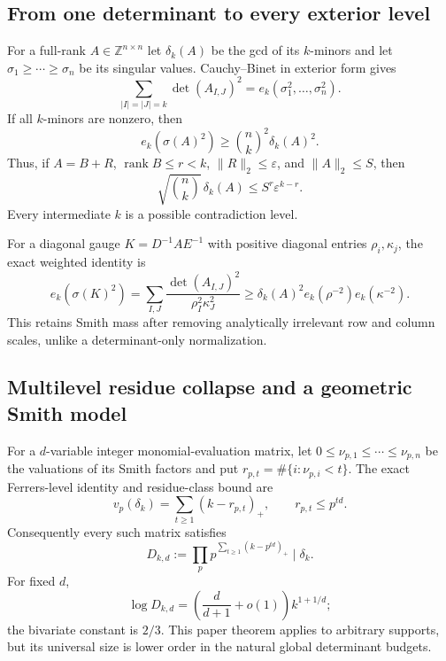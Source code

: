 \documentclass[11pt,oneside]{article}
\theoremstyle{definition}
\theoremstyle{remark}
\newcommand{\Z}{\mathbb Z}
\begin{document}
\subsection{From one determinant to every exterior level}
\label{wsmith:smith-profile}

For a full-rank $A\in\Z^{n\times n}$ let $\delta_k(A)$ be the gcd of its $k$-minors and let
$\sigma_1\ge\cdots\ge\sigma_n$ be its singular values.  Cauchy--Binet in exterior form gives
\begin{equation}
 \sum_{|I|=|J|=k}\det(A_{I,J})^2
 =e_k(\sigma_1^2,\ldots,\sigma_n^2).
 \label{wsmith:eq-exterior-minors}
\end{equation}
If all $k$-minors are nonzero, then
\begin{equation}
 e_k(\sigma(A)^2)\ge\binom nk^2\delta_k(A)^2.
 \label{wsmith:eq-smith-mass}
\end{equation}
Thus, if $A=B+R$, $\operatorname{rank}B\le r<k$, $\|R\|_2\le\varepsilon$, and
$\|A\|_2\le S$, then
\begin{equation}
 \boxed{\sqrt{\binom nk}\,\delta_k(A)\le S^r\varepsilon^{k-r}.}
 \label{wsmith:eq-bulk-smith}
\end{equation}
Every intermediate $k$ is a possible contradiction level.

For a diagonal gauge $K=D^{-1}AE^{-1}$ with positive diagonal entries $\rho_i,\kappa_j$,
the exact weighted identity is
\begin{equation}
 e_k(\sigma(K)^2)
 =\sum_{I,J}\frac{\det(A_{I,J})^2}{\rho_I^2\kappa_J^2}
 \ge\delta_k(A)^2 e_k(\rho^{-2})e_k(\kappa^{-2}).
 \label{wsmith:eq-weighted-smith}
\end{equation}
This retains Smith mass after removing analytically irrelevant row and column scales, unlike
a determinant-only normalization.

\subsection{Multilevel residue collapse and a geometric Smith model}
\label{wsmith:modular-smith}

For a $d$-variable integer monomial-evaluation matrix, let
$0\le\nu_{p,1}\le\cdots\le\nu_{p,n}$ be the valuations of its Smith factors and put
$r_{p,t}=\#\{i:\nu_{p,i}<t\}$.  The exact Ferrers-level identity and residue-class bound are
\begin{equation}
 v_p(\delta_k)=\sum_{t\ge1}(k-r_{p,t})_+,
 \qquad r_{p,t}\le p^{td}.
 \label{wsmith:eq-level-decomposition}
\end{equation}
Consequently every such matrix satisfies
\begin{equation}
 \boxed{D_{k,d}:=\prod_p p^{\sum_{t\ge1}(k-p^{td})_+}\mid\delta_k.}
 \label{wsmith:eq-universal-divisor}
\end{equation}
For fixed $d$,
\begin{equation}
 \log D_{k,d}=\left(\frac d{d+1}+o(1)\right)k^{1+1/d};
 \label{wsmith:eq-divisor-asymptotic}
\end{equation}
the bivariate constant is $2/3$.  This paper theorem applies to arbitrary supports, but its
universal size is lower order in the natural global determinant budgets.
\end{document}
